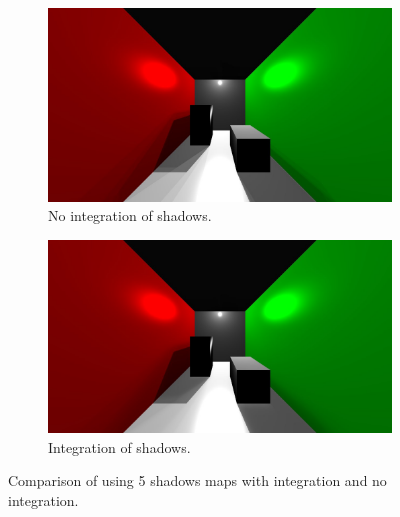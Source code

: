 \begin{figure}
	\centering
	\begin{subfigure}[b]{1.0\textwidth}
		\includegraphics[width=\textwidth]{AltResults/noIntegration.jpg}
		\caption{No integration of shadows.}
	\end{subfigure}
	\centering
	\begin{subfigure}[b]{1.0\textwidth}
		\includegraphics[width=\textwidth]{AltResults/integration.jpg}
		\caption{Integration of shadows.}
	\end{subfigure}
	\caption{Comparison of using 5 shadows maps with integration and no integration.}\label{fig:intCompare}
\end{figure}

